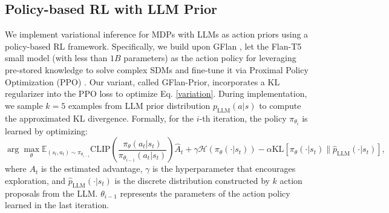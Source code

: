 \documentclass{article} %
\theoremstyle{plain}
\theoremstyle{definition}
\theoremstyle{remark}
\newcommand{\eq}{{Eq. }}
\begin{document}
{\subsection{Policy-based RL with LLM Prior}
\label{sec: online_policy_rl}

We implement variational inference for MDPs with LLMs as action priors using a policy-based RL framework. Specifically, we build upon GFlan \citep{carta2023grounding}, let the Flan-T5 small model \citep{rae2021scaling} (with less than $1B$ parameters) as the action policy for leveraging pre-stored knowledge to solve complex SDMs and fine-tune it via Proximal Policy Optimization (PPO) \citep{schulman2017proximal}. Our variant, called GFlan-Prior, incorporates a KL regularizer into the PPO loss to optimize \eq \ref{variation}. During implementation, we sample $k=5$ examples from LLM prior distribution $p_\text{LLM}(a|s)$ to compute the approximated KL divergence.
Formally, for the $i$-th iteration, the policy $\pi_{\theta_i}$ is learned by optimizing:
\begin{equation}\label{ppo}\arg\max_\theta\mathbb{E}_{(s_t,a_t)\sim \pi_{\theta_{i-1}}}\text{CLIP}\left(\frac{\pi_\theta(a_t|s_t)}{\pi_{\theta_{i-1}}(a_t|s_t)}\right)\hat{A}_t+\gamma \mathcal{H}(\pi_\theta(\cdot|s_t))-\alpha\text{KL}[\pi_\theta(\cdot|s_t)\|\hat{p}_\text{LLM}(\cdot|s_t)],
\end{equation}
where $A_t$ is the estimated advantage, $\gamma$ is the hyperparameter that encourages exploration, and $\hat{p}_\text{LLM}(\cdot|s_t)$ is the discrete distribution constructed by $k$ action proposals from the LLM. ${\theta_{i-1}}$ represents the parameters of the action policy learned in the last iteration.





}
\end{document}
